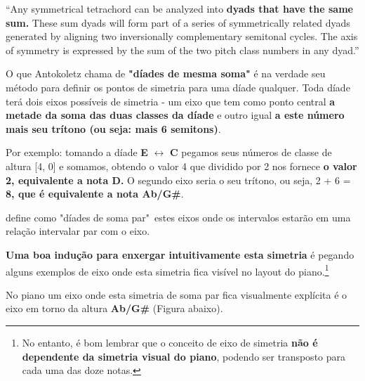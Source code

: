 \documentclass[
	12pt,				%
	openright,			%
	twoside,			%
	a4paper,			%
	english,			%
	french,				%
	spanish,			%
	brazil				%
	]{abntex2}
\begin{document}
\begin{citacao}
“Any symmetrical tetrachord can be analyzed into\textbf{ dyads that have the same sum.} These sum dyads will form part of a series of symmetrically related dyads generated by aligning two inversionally complementary semitonal cycles. The axis of symmetry is expressed by the sum of the two pitch class numbers in any dyad.”
\cite[ p.72]{antokoletz1984music}
\end{citacao}

O que Antokoletz chama de \textbf{"díades de mesma soma"} é na verdade seu método para definir os pontos de simetria para uma díade qualquer. Toda díade terá dois eixos possíveis de simetria - um eixo que tem como ponto central \textbf{a metade da soma das duas classes da díade} e outro igual \textbf{a este número mais seu trítono (ou seja: mais 6 semitons)}. 

Por exemplo: tomando a díade \textbf{E} $\leftrightarrow $ \textbf{C} pegamos seus números de classe de altura [4, 0] e somamos, obtendo o valor 4 que dividido por 2 nos fornece \textbf{o valor 2, equivalente a nota D.} O segundo eixo seria o seu trítono, ou seja, 2 + 6 =\textbf{ 8, que é equivalente a nota Ab/G\#}. 
\pagebreak

 define como "díades de soma par"\ estes eixos onde os intervalos estarão em uma relação intervalar par com o eixo.

\textbf{Uma boa indução para enxergar intuitivamente esta simetria} é pegando alguns exemplos de eixo onde esta simetria fica visível no layout do piano.\footnote{No entanto, é bom lembrar que o conceito de eixo de simetria \textbf{não é dependente  da simetria visual do piano}, podendo ser transposto para cada uma das doze notas.}

No piano um eixo onde esta simetria de soma par fica visualmente explícita é o eixo em torno da altura \textbf{Ab/G\#} (Figura abaixo).
\end{document}
